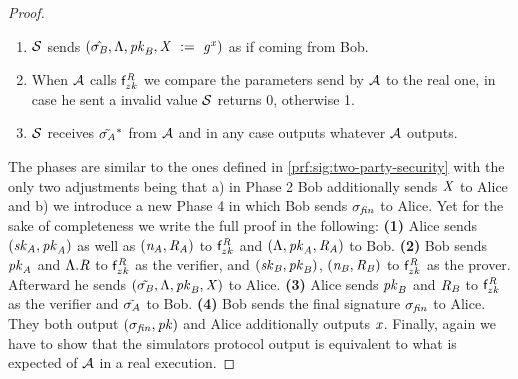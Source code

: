 \begin{proof}
\begin{enumerate}
        \item $\mathcal{S}$ sends $(\hat{\sigma_{\mathit{B}}}, \Lambda, \mathit{pk}_{\mathit{B}}, \mathit{X} ~:=~ \mathit{g}^{\mathit{x}})$ as if coming from Bob.
        \item When $\mathcal{A}$ calls $\mathsf{f}^{\mathit{R}}_{zk}$ we compare the parameters send by $\mathcal{A}$ to the real one, in case he sent a invalid value $\mathcal{S}$ returns 0, otherwise 1.
        \item $\mathcal{S}$ receives $\tilde{\sigma_{\mathit{A}}}^*$ from $\mathcal{A}$ and in any case outputs whatever $\mathcal{A}$ outputs.
    \end{enumerate}

    The phases are similar to the ones defined in \cref{prf:sig:two-party-security} with the only two adjustments being that a) in Phase 2 Bob additionally sends $\mathit{X}$ to Alice and b) we introduce a new Phase 4 in which Bob sends $\sigma_{\mathit{fin}}$ to Alice.
    Yet for the sake of completeness we write the full proof in the following:
    \textbf{(1)} Alice sends $(\mathit{sk}_{\mathit{A}}, \mathit{pk}_{\mathit{A}})$ as well as $(\mathit{\mathit{n}_{\mathit{A}}}, \mathit{R}_{\mathit{A}})$ to $\mathsf{f}^{\mathit{R}}_{zk}$ and $(\Lambda, \mathit{pk}_{\mathit{A}}, \mathit{R}_{\mathit{A}})$ to Bob.
    \textbf{(2)} Bob sends $\mathit{pk}_{\mathit{A}}$ and $\Lambda.\mathit{R}$ to $\mathsf{f}^{\mathit{R}}_{zk}$ as the verifier, and  $(\mathit{sk}_{\mathit{B}}, \mathit{pk}_{\mathit{B}})$, $(\mathit{\mathit{n}_{\mathit{B}}}, \mathit{R}_{\mathit{B}})$ to $\mathsf{f}^{\mathit{R}}_{zk}$ as the prover.
    Afterward he sends $(\tilde{\sigma_{\mathit{B}}}, \Lambda, \mathit{pk}_{\mathit{B}}, \mathit{X})$ to Alice.
    \textbf{(3)} Alice sends $\mathit{pk}_{\mathit{B}}$ and $\mathit{R}_{\mathit{B}}$ to $\mathsf{f}^{\mathit{R}}_{zk}$ as the verifier and $\tilde{\sigma_{\mathit{A}}}$ to Bob.
    \textbf{(4)} Bob sends the final signature $\sigma_{\mathit{fin}}$ to Alice.
    They both output $(\sigma_{\mathit{fin}}, \mathit{pk})$ and Alice additionally outputs $\mathit{x}$.
    Finally, again we have to show that the simulators protocol output is equivalent to what is expected of $\mathcal{A}$ in a real execution.


\end{proof}
